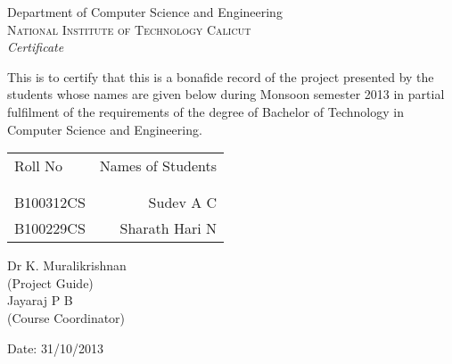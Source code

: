 \newpage
\thispagestyle{empty}

\begin{center}

\huge{Department of Computer Science and Engineering}\\[0.5cm]
\normalsize
\textsc{National Institute of Technology Calicut}\\[2.0cm]

\emph{\LARGE Certificate}\\[2.5cm]
\end{center}
\normalsize This is to certify that this is a bonafide record of the project presented by the students whose names are given below during Monsoon semester 2013 in partial fulfilment of the requirements of the degree of Bachelor of Technology in Computer Science and Engineering.\\[1.0cm]

\begin{table}[h]
\centering
\begin{tabular}{lr}
Roll No & Names of Students \\ \\ \hline
\\
B100312CS & Sudev A C \\ 
B100229CS & Sharath Hari N \\
\end{tabular}
\end{table}

\vfill


\begin{flushright}
Dr K. Muralikrishnan\\
(Project Guide)\\[1.5cm]
Jayaraj P B\\
(Course Coordinator)\\
\end{flushright}

\begin{flushleft}
Date: 31/10/2013
\end{flushleft}
